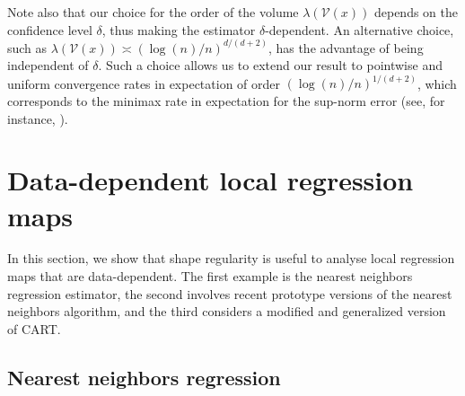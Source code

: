 \documentclass[paper=a4, fontsize=11pt]{scrartcl}
\begin{document}
Note also that our choice for the order of the volume $\lambda(\mathcal V(x))$ depends on the confidence level $\delta$, thus making the estimator $\delta$-dependent. An alternative choice, such as $\lambda(\mathcal V(x)) \asymp (\log(n) / n)^{d/(d+2)}$, has the advantage of being independent of $\delta$.
Such a choice allows us to extend our result to pointwise and uniform convergence rates in expectation of order $(\log(n)/n)^{1/(d+2)}$, which corresponds to the minimax rate in expectation for the sup-norm error (see, for instance, \citep{tsybakov2009}). %


\color{black}

\section{Data-dependent local regression maps}\label{s5}
In this section, we show that shape regularity is useful to analyse local regression maps that are data-dependent. The first example is the nearest neighbors regression estimator, the second involves recent prototype versions of the nearest neighbors algorithm, and the third considers a modified and generalized version of CART. 
\subsection{Nearest neighbors regression}\label{s61}
\end{document}
